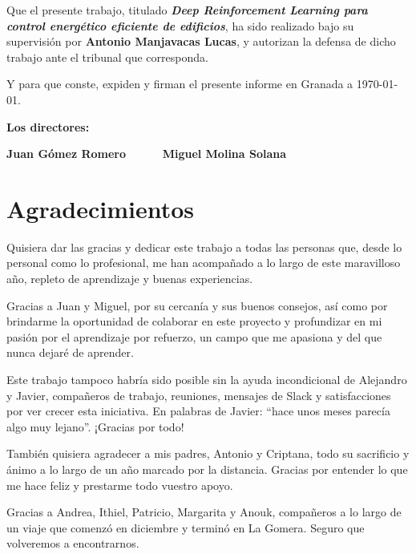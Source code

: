 Que el presente trabajo, titulado \textit{\textbf{Deep Reinforcement Learning para control energético eficiente de edificios}}, ha sido realizado bajo su supervisión por \textbf{Antonio Manjavacas Lucas}, y autorizan la defensa de dicho trabajo ante el tribunal que corresponda.

\vspace{0.5cm}

Y para que conste, expiden y firman el presente informe en Granada a \today.

\vspace{1cm}

\textbf{Los directores:}

\vspace{5cm}

\begin{center}
    \noindent \textbf{Juan Gómez Romero \ \ \ \ \ Miguel Molina Solana}
\end{center}

\chapter*{Agradecimientos}
\thispagestyle{empty}

\vspace{1cm}

Quisiera dar las gracias y dedicar este trabajo a todas las personas que, desde lo personal como lo profesional, me han acompañado a lo largo de este maravilloso año, repleto de aprendizaje y buenas experiencias.

Gracias a Juan y Miguel, por su cercanía y sus buenos consejos, así como por brindarme la oportunidad de colaborar en este proyecto y profundizar en mi pasión por el aprendizaje por refuerzo, un campo que me apasiona y del que nunca dejaré de aprender. 

Este trabajo tampoco habría sido posible sin la ayuda incondicional de Alejandro y Javier, compañeros de trabajo, reuniones, mensajes de Slack y satisfacciones por ver crecer esta iniciativa. En palabras de Javier: ``hace unos meses parecía algo muy lejano''. ¡Gracias por todo!

También quisiera agradecer a mis padres, Antonio y Criptana, todo su sacrificio y ánimo a lo largo de un año marcado por la distancia. Gracias por entender lo que me hace feliz y prestarme todo vuestro apoyo.

Gracias a Andrea, Ithiel, Patricio, Margarita y Anouk, compañeros a lo largo de un viaje que comenzó en diciembre y terminó en La Gomera. Seguro que volveremos a encontrarnos.

